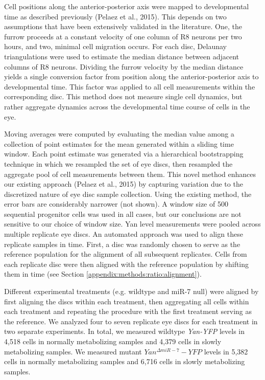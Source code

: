 Cell positions along the anterior-posterior axis were mapped to developmental time as described previously (Pelaez et al., 2015). This depends on two assumptions that have been extensively validated in the literature. One, the furrow proceeds at a constant velocity of one column of R8 neurons per two hours, and two, minimal cell migration occurs. For each disc, Delaunay triangulations were used to estimate the median distance between adjacent columns of R8 neurons. Dividing the furrow velocity by the median distance yields a single conversion factor from position along the anterior-posterior axis to developmental time. This factor was applied to all cell measurements within the corresponding disc. This method does not measure single cell dynamics, but rather aggregate dynamics across the developmental time course of cells in the eye.

Moving averages were computed by evaluating the median value among a collection of point estimates for the mean generated within a sliding time window. Each point estimate was generated via a hierarchical bootstrapping technique in which we resampled the set of eye discs, then resampled the aggregate pool of cell measurements between them. This novel method enhances our existing approach (Pelaez et al., 2015) by capturing variation due to the discretized nature of eye disc sample collection. Using the existing method, the error bars are considerably narrower (not shown). A window size of 500 sequential progenitor cells was used in all cases, but our conclusions are not sensitive to our choice of window size. Yan level measurements were pooled across multiple replicate eye discs. An automated approach was used to align these replicate samples in time. First, a disc was randomly chosen to serve as the reference population for the alignment of all subsequent replicates. Cells from each replicate disc were then aligned with the reference population by shifting them in time (see Section \ref{appendix:methods:ratio:alignment}). 

Different experimental treatments (e.g. wildtype and miR-7 null) were aligned by first aligning the discs within each treatment, then aggregating all cells within each treatment and repeating the procedure with the first treatment serving as the reference. We analyzed four to seven replicate eye discs for each treatment in two separate experiments. In total, we measured wildtype \textit{Yan-YFP} levels in 4,518 cells in normally metabolizing samples and 4,379 cells in slowly metabolizing samples. We measured mutant $Yan^{\Delta miR-7}-YFP$ levels in 5,382 cells in normally metabolizing samples and 6,716 cells in slowly metabolizing samples.

